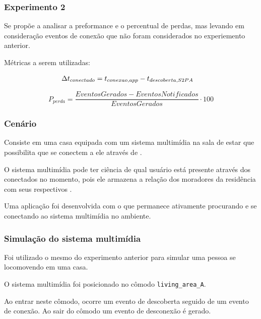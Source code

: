 \documentclass[aspectratio=169]{beamer}
\begin{document}
\begin{frame}
	\frametitle{Experimento 2}
	Se propõe a analisar a preformance e o percentual de perdas, mas levando em consideração eventos de conexão que não foram considerados no experiemento anterior.

	\bigskip

	Métricas a serem utilizadas:
	
	\begin{align}
		\label{equ:performance-ready}
		\Delta t_{conectado} &= t_{conexao,app} - t_{descoberta,S2PA}
	\end{align}
	
	\begin{equation}
		P_{perda} = \frac{EventosGerados - EventosNotificados}{EventosGerados} \cdot 100
	\end{equation}
\end{frame}

\begin{frame}
	\frametitle{Cenário}
	Consiste em uma casa equipada com um sistema multimídia na sala de estar que possibilita que \smartphones se conectem a ele através de \bluetooth.

	\bigskip

	O sistema multimídia pode ter ciência de qual usuário está presente através dos \smartphones conectados no momento, pois ele armazena a relação dos moradores da residência com seus respectivos \smartphones.

	\bigskip

	Uma aplicação \android foi desenvolvida com o \middleware \mhubcddl que permanece ativamente procurando e se conectando ao sistema multimídia no ambiente.
\end{frame}

\begin{frame}
	\frametitle{Simulação do sistema multimídia}
	Foi utilizado o mesmo \dataset do experimento anterior para simular uma pessoa se locomovendo em uma casa.

	\bigskip

	O sistema multimídia foi posicionado no cômodo \texttt{living\_area\_A}.

	\bigskip

	Ao entrar neste cômodo, ocorre um evento de descoberta seguido de um evento de conexão. Ao sair do cômodo um evento de desconexão é gerado.
\end{frame}
\end{document}
